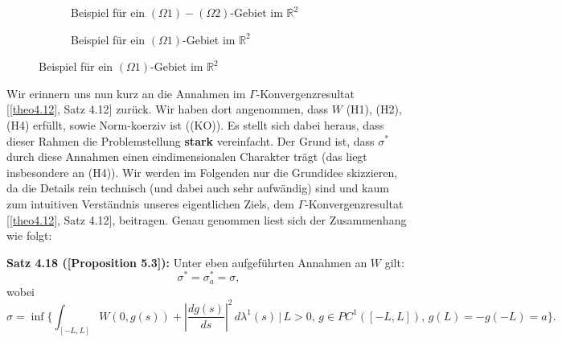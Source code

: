 \begin{figure} 
  \centering
  \begin{subfigure}{.3\textwidth}
\caption*{Beispiel für ein \((\Omega 1)-(\Omega 2)\)-Gebiet im \(\mathbb{R}^2\)}
\end{subfigure}%
\quad \quad \quad
\begin{subfigure}{.3\textwidth}
\centering
{}
\caption*{Beispiel für ein \((\Omega1)\)-Gebiet im \(\mathbb{R}^2\)}
\end{subfigure}
\label{fig:Omega12}
\end{figure}

Wir erinnern uns nun kurz an die Annahmen im \(\Gamma\)-Konvergenzresultat [\ref{theo4.12}, Satz 4.12] zurück. Wir haben dort angenommen, dass \(W\) (H1), (H2), (H4) erfüllt, sowie Norm-koerziv ist ((KO)). Es stellt sich dabei heraus, dass dieser Rahmen die Problemstellung \textbf{stark} vereinfacht. Der Grund ist, dass \(\sigma^*\) durch diese Annahmen einen eindimensionalen Charakter trägt (das liegt insbesondere an (H4)). Wir werden im Folgenden nur die Grundidee skizzieren, da die Details rein technisch (und dabei auch sehr aufwändig) sind und kaum zum intuitiven Verständnis unseres eigentlichen Ziels, dem \(\Gamma\)-Konvergenzresultat [\ref{theo4.12}, Satz 4.12], beitragen. Genau genommen liest sich der Zusammenhang wie folgt:\\[0.5cm]
\colorbox{generalYellow}{\begin{minipage}{16cm}{\textcolor{black}{}{\label{theo4.18}}}
\textbf{Satz 4.18 (\cite{ContiTwoGradientPhase}[Proposition 5.3]):} Unter eben aufgeführten Annahmen an \(W\) gilt:
\begin{equation}
    \sigma^* = \sigma^*_a = \sigma,
\end{equation}
wobei
\begin{equation}
    \sigma = \inf \{ \int_{[-L,L]} W(0,g(s)) + |\frac{dg(s)}{ds}|^2 \,d\lambda^1(s) \, | \, L > 0, \, g \in PC^1([-L,L]), \, g(L) = -g(-L) = a\}.
\end{equation}
\end{minipage}}

